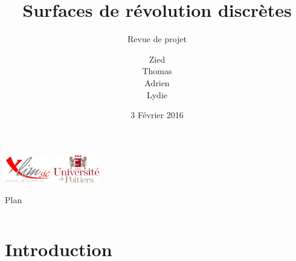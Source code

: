 \documentclass[xcolor=dvipsnames]{beamer}
\title[Revue de projet]{Surfaces de r\'evolution discrètes}
\subtitle{Revue de projet}
\author[]{Zied \smallcaps{Ben} \smallcaps{Othmane} \\ Thomas \smallcaps{Benoist}
	\\ Adrien \smallcaps{Bisutti} \\ Lydie \smallcaps{Richaume}}
\institute{Universit\'e de Poitiers}
\date{3 Février 2016}
\begin{document}


\begin{frame}
	\titlepage
	\includegraphics[width=2cm]{../Images/logo-Xlim.png}
	\hfill
	\includegraphics[width=2cm]{../Images/logo_univ_poitiers.png}
\end{frame}




\begin{frame}{Plan}
	\begin{columns}
		\begin{column}{5cm}
		  	\tableofcontents[sections={1-3}, hideallsubsections]
		\end{column}
		\begin{column}{5cm}
		  	\tableofcontents[sections={4-7}, hideallsubsections]
		\end{column}
	\end{columns}
\end{frame}



\section{Introduction}

\end{document}
